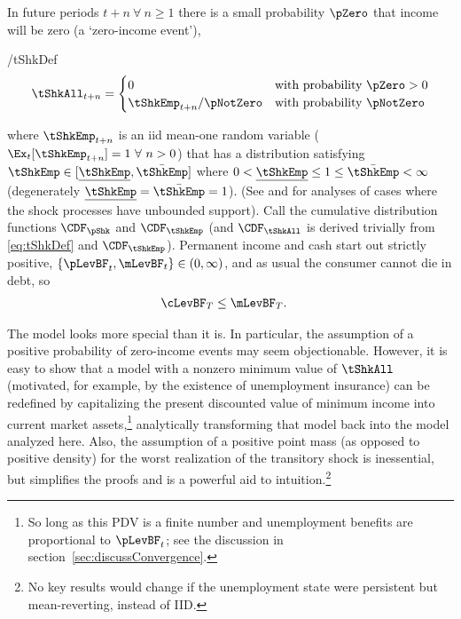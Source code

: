 \documentclass[BufferStockTheory]{subfiles}
\begin{document}
In future periods $t+n ~\forall~ n \geq 1$ there is a small probability $\pZero$ that income will
be zero (a `zero-income event'),
\begin{verbatimwrite}{\EqDir/tShkDef}
  \begin{equation}
    \tShkAll _{t+n}=
    \begin{cases}
      0\phantom{_{t+1}/\pNotZero} & \text{with probability $\pZero>0$} \\
      \tShkEmp_{t+n}/\pNotZero      & \text{with probability $\pNotZero  $} %
    \end{cases} \label{eq:tShkDef}
  \end{equation}
\end{verbatimwrite}

where $\tShkEmp_{t+n}$ is an iid mean-one random variable
($\Ex_{t}[{\tShkEmp}_{t+n}]=1~\forall~n>0$)
that has a distribution
satisfying $\tShkEmp \in \lbrack \ushort{\tShkEmp},\bar{\tShkEmp}\rbrack$
where $0<\ushort{\tShkEmp} \leq 1 \leq \bar{\tShkEmp}<\infty$
(degenerately $\ushort{\tShkEmp}=\bar{\tShkEmp}=1$). (See \cite{rabaultBorrowing} and \cite{lsIncFluct} for analyses of cases where the shock processes have unbounded support).  Call the cumulative
distribution functions $\CDF_{\pShk}$ and $\CDF_{\tShkEmp}$ (and $\CDF_{\tShkAll}$
is derived trivially from \eqref{eq:tShkDef} and $\CDF_{\tShkEmp}$).
Permanent income and cash start out strictly positive, $\{\pLevBF_{t},\mLevBF_{t}\} \in
(0,\infty)$, and as usual the consumer cannot die in
debt, so
\begin{align}
  \cLevBF_{T} & \leq  \mLevBF_{T} \label{eq:NoDebtAtDeath}.
\end{align}

\hypertarget{PDV}{}
The model looks more special than it is.  In particular, the
assumption of a positive probability of zero-income events may seem
objectionable.  However, it is easy to show that a model with a
nonzero minimum value of $\tShkAll$ (motivated, for example, by the
existence of unemployment insurance) can be redefined by capitalizing
the present discounted value of minimum income into current market assets,\footnote{So long
  as this PDV is a finite number and unemployment benefits are
  proportional to $\pLevBF_{t}$; see the discussion in
  section~\ref{sec:discussConvergence}.}  analytically transforming
that model back into the model analyzed here.  Also, the assumption of
a positive point mass (as opposed to positive density) for the worst
realization of the transitory shock is inessential, but simplifies the proofs and is a powerful aid to intuition.\footnote{No key results would change if the unemployment state were persistent but mean-reverting, instead of IID.}
\end{document}
